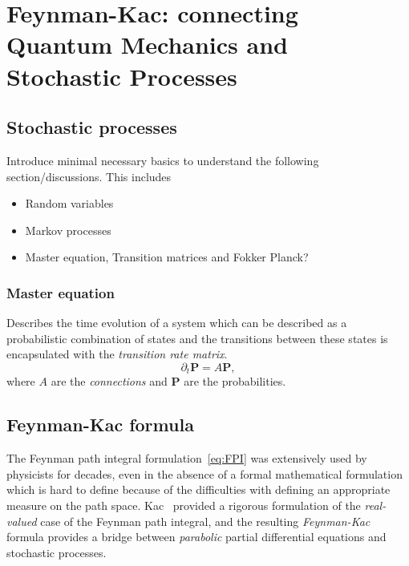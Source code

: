 \newpage
\section[The Feynman-Kac formula]{Feynman-Kac: connecting Quantum Mechanics and Stochastic Processes}
\label{subsec:FK}

\subsection{Stochastic processes}
\label{subsec:fk-stoch}


Introduce minimal necessary basics to understand the following section/discussions. This includes
\begin{itemize}
	\item Random variables
	\item Markov processes
	\item Master equation, Transition matrices and Fokker Planck?
\end{itemize}

\subsubsection{Master equation}
Describes the time evolution of a system which can be described as a probabilistic combination of states and the transitions between these states is encapsulated with the \emph{transition rate matrix}.
\begin{equation}
	\partial_{t} \mathbf{P} = A \mathbf{P},
\end{equation}
where $A$ are the \emph{connections} and $\mathbf{P}$ are the probabilities.  

\subsection{Feynman-Kac formula}
\label{subsec:fk-fk}
The Feynman path integral formulation~\eqref{eq:FPI} was extensively used by physicists for decades, even in the absence of a formal mathematical formulation which is hard to define because of the difficulties with defining an appropriate measure on the path space. Kac~\cite{kac1949distributions} provided a rigorous formulation of the \textit{real-valued} case of the Feynman path integral, and the resulting \emph{Feynman-Kac} formula provides a bridge between \emph{parabolic} partial differential equations and stochastic processes.

